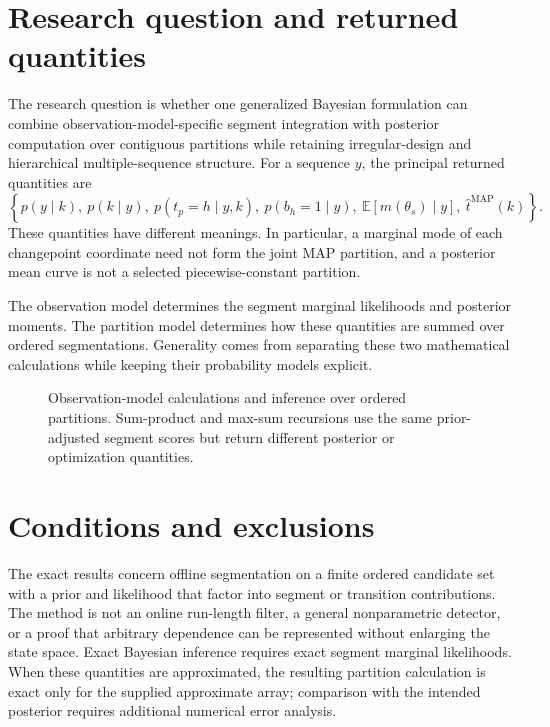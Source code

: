 \section{Research question and returned quantities}
The research question is whether one generalized Bayesian formulation can combine
observation-model-specific segment integration with posterior computation over contiguous
partitions while retaining irregular-design and hierarchical multiple-sequence structure. For a
sequence $y$, the principal returned quantities are
\[
\left\{p(y\mid k),\ p(k\mid y),\ p(t_p=h\mid y,k),\
p(b_h=1\mid y),\ \mathbb E[m(\theta_s)\mid y],\
\widehat t^{\mathrm{MAP}}(k)\right\}.
\]
These quantities have different meanings. In particular, a marginal mode of each changepoint
coordinate need not form the joint MAP partition, and a posterior mean curve is not a selected
piecewise-constant partition.

\begin{keyidea}
The observation model determines the segment marginal likelihoods and posterior moments. The
partition model determines how these quantities are summed over ordered segmentations. Generality
comes from separating these two mathematical calculations while keeping their probability models
explicit.
\end{keyidea}

\begin{figure}[H]
\centering
\resizebox{0.96\textwidth}{!}{}
\caption{Observation-model calculations and inference over ordered partitions. Sum-product and
max-sum recursions use the same prior-adjusted segment scores but return different posterior or
optimization quantities.}
\label{fig:block-to-global}
\end{figure}

\section{Conditions and exclusions}
The exact results concern offline segmentation on a finite ordered candidate set with a prior and
likelihood that factor into segment or transition contributions. The method is not an online
run-length filter, a general nonparametric detector, or a proof that arbitrary dependence can be
represented without enlarging the state space. Exact Bayesian inference requires exact segment
marginal likelihoods. When these quantities are approximated, the resulting partition calculation
is exact only for the supplied approximate array; comparison with the intended posterior requires
additional numerical error analysis.

